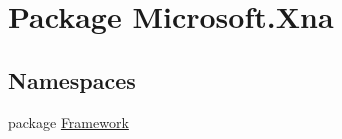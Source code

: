 \hypertarget{namespace_microsoft_1_1_xna}{\section{Package Microsoft.\+Xna}
\label{namespace_microsoft_1_1_xna}
}
\subsection*{Namespaces}
\begin{DoxyCompactItemize}
\item 
package \hyperlink{namespace_microsoft_1_1_xna_1_1_framework}{Framework}
\end{DoxyCompactItemize}
